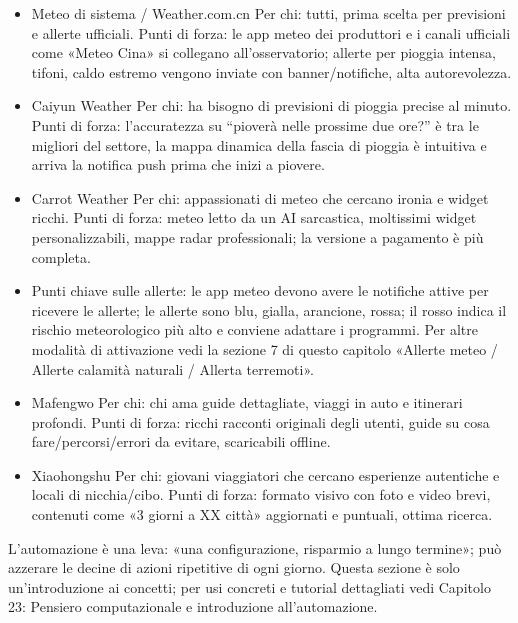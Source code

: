 \begin{itemize}
  \item Meteo di sistema / Weather.com.cn Per chi: tutti, prima scelta per previsioni e allerte ufficiali. Punti di forza: le app meteo dei produttori e i canali ufficiali come «Meteo Cina» si collegano all'osservatorio; allerte per pioggia intensa, tifoni, caldo estremo vengono inviate con banner/notifiche, alta autorevolezza.
  \item Caiyun Weather Per chi: ha bisogno di previsioni di pioggia precise al minuto. Punti di forza: l'accuratezza su “pioverà nelle prossime due ore?” è tra le migliori del settore, la mappa dinamica della fascia di pioggia è intuitiva e arriva la notifica push prima che inizi a piovere.
  \item Carrot Weather Per chi: appassionati di meteo che cercano ironia e widget ricchi. Punti di forza: meteo letto da un AI sarcastica, moltissimi widget personalizzabili, mappe radar professionali; la versione a pagamento è più completa.
  \item Punti chiave sulle allerte: le app meteo devono avere le notifiche attive per ricevere le allerte; le allerte sono blu, gialla, arancione, rossa; il rosso indica il rischio meteorologico più alto e conviene adattare i programmi. Per altre modalità di attivazione vedi la sezione 7 di questo capitolo «Allerte meteo / Allerte calamità naturali / Allerta terremoti».
\end{itemize}


\begin{itemize}
  \item Mafengwo Per chi: chi ama guide dettagliate, viaggi in auto e itinerari profondi. Punti di forza: ricchi racconti originali degli utenti, guide su cosa fare/percorsi/errori da evitare, scaricabili offline.
  \item Xiaohongshu Per chi: giovani viaggiatori che cercano esperienze autentiche e locali di nicchia/cibo. Punti di forza: formato visivo con foto e video brevi, contenuti come «3 giorni a XX città» aggiornati e puntuali, ottima ricerca.
\end{itemize}


L'automazione è una leva: «una configurazione, risparmio a lungo termine»; può azzerare le decine di azioni ripetitive di ogni giorno. Questa sezione è solo un'introduzione ai concetti; per usi concreti e tutorial dettagliati vedi Capitolo 23: Pensiero computazionale e introduzione all'automazione.

